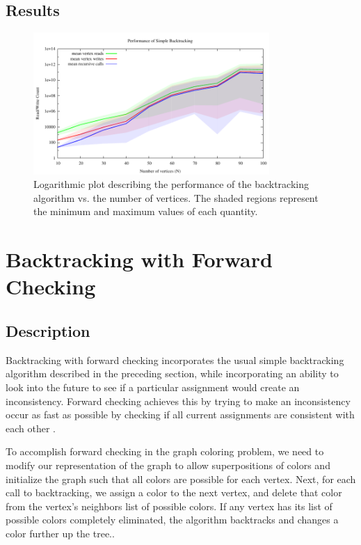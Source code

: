 \documentclass{article}
\begin{document}
	
	\subsection{Results}
		
		\begin{figure}[h!]
			\centering
			\includegraphics[width=0.8\textwidth]{../results_4/backtracking_simple/bt_simple_performance}
			\caption{Logarithmic plot describing the performance of the backtracking algorithm vs. the number of vertices. The shaded regions represent the minimum and maximum values of each quantity.}
		\end{figure}
	
\section{Backtracking with Forward Checking}

	\subsection{Description}
	
		Backtracking with forward checking incorporates the usual simple backtracking algorithm described in the preceding section, while incorporating an ability to look into the future to see if a particular assignment would create an inconsistency. Forward checking achieves this by trying to make an inconsistency occur as fast as possible by checking if all current assignments are consistent with each other \cite{haralick}.
		
		To accomplish forward checking in the graph coloring problem, we need to modify our representation of the graph to allow superpositions of colors and initialize the graph such that all colors are possible for each vertex. Next, for each call to backtracking, we assign a color to the next vertex, and delete that color from the vertex's neighbors list of possible colors. If any vertex has its list of possible colors completely eliminated, the algorithm backtracks and changes a color further up the tree.\cite{ai}.
		
\end{document}
